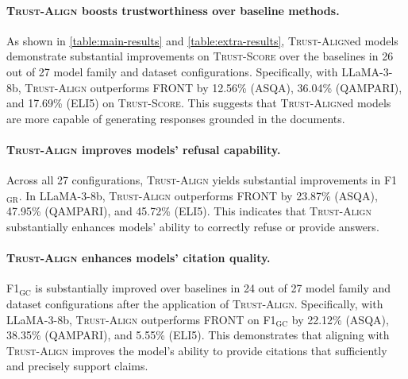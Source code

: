 \documentclass{article} %
\newcommand{\method}[0]{\textsc{Trust-Align}}
\newcommand{\metric}[0]{\textsc{Trust-Score}}
\begin{document}
\paragraph{\method{} boosts trustworthiness over baseline methods.}
As shown in \cref{table:main-results} and \cref{table:extra-results}, \method{}ed models demonstrate substantial improvements on \metric{} over the baselines in 26 out of 27 model family and dataset configurations. Specifically, with LLaMA-3-8b, \method{} outperforms FRONT by 12.56\% (ASQA), 36.04\% (QAMPARI), and 17.69\% (ELI5) on \metric{}. This suggests that \method{}ed models are more capable of generating responses grounded in the documents. 

\paragraph{\method{} improves models' refusal capability.} 
Across all 27 configurations, \method{} yields substantial  improvements in F1$_{\text{GR}}$. In LLaMA-3-8b, \method{} outperforms FRONT by 23.87\% (ASQA), 47.95\% (QAMPARI), and 45.72\% (ELI5). This indicates that \method{} substantially enhances models' ability to correctly refuse or provide answers.


\paragraph{\method{} enhances models' citation quality.} F1$_{\text{GC}}$ is substantially improved over baselines in 24 out of 27 model family and dataset configurations after the application of \method{}. Specifically, with LLaMA-3-8b, \method{} outperforms FRONT on F1$_{\text{GC}}$ by 22.12\% (ASQA), 38.35\% (QAMPARI), and 5.55\% (ELI5). This demonstrates that aligning with \method{} improves the model's ability to provide citations that sufficiently and precisely support claims.
\end{document}
